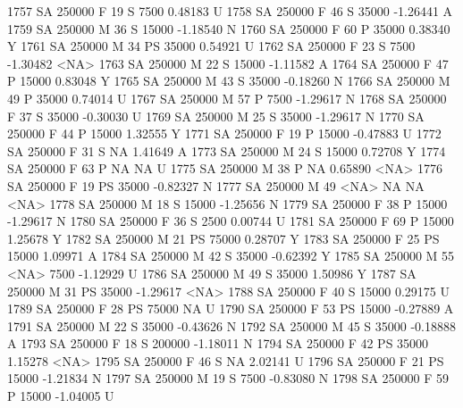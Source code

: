 \documentclass{article}
\begin{document}
\begin{Schunk}
\begin{Soutput}
1757     SA     250000   F  19         S   7500   0.48183    U
1758     SA     250000   F  46         S  35000  -1.26441    A
1759     SA     250000   M  36         S  15000  -1.18540    N
1760     SA     250000   F  60         P  35000   0.38340    Y
1761     SA     250000   M  34        PS  35000   0.54921    U
1762     SA     250000   F  23         S   7500  -1.30482 <NA>
1763     SA     250000   M  22         S  15000  -1.11582    A
1764     SA     250000   F  47         P  15000   0.83048    Y
1765     SA     250000   M  43         S  35000  -0.18260    N
1766     SA     250000   M  49         P  35000   0.74014    U
1767     SA     250000   M  57         P   7500  -1.29617    N
1768     SA     250000   F  37         S  35000  -0.30030    U
1769     SA     250000   M  25         S  35000  -1.29617    N
1770     SA     250000   F  44         P  15000   1.32555    Y
1771     SA     250000   F  19         P  15000  -0.47883    U
1772     SA     250000   F  31         S     NA   1.41649    A
1773     SA     250000   M  24         S  15000   0.72708    Y
1774     SA     250000   F  63         P     NA        NA    U
1775     SA     250000   M  38         P     NA   0.65890 <NA>
1776     SA     250000   F  19        PS  35000  -0.82327    N
1777     SA     250000   M  49      <NA>     NA        NA <NA>
1778     SA     250000   M  18         S  15000  -1.25656    N
1779     SA     250000   F  38         P  15000  -1.29617    N
1780     SA     250000   F  36         S   2500   0.00744    U
1781     SA     250000   F  69         P  15000   1.25678    Y
1782     SA     250000   M  21        PS  75000   0.28707    Y
1783     SA     250000   F  25        PS  15000   1.09971    A
1784     SA     250000   M  42         S  35000  -0.62392    Y
1785     SA     250000   M  55      <NA>   7500  -1.12929    U
1786     SA     250000   M  49         S  35000   1.50986    Y
1787     SA     250000   M  31        PS  35000  -1.29617 <NA>
1788     SA     250000   F  40         S  15000   0.29175    U
1789     SA     250000   F  28        PS  75000        NA    U
1790     SA     250000   F  53        PS  15000  -0.27889    A
1791     SA     250000   M  22         S  35000  -0.43626    N
1792     SA     250000   M  45         S  35000  -0.18888    A
1793     SA     250000   F  18         S 200000  -1.18011    N
1794     SA     250000   F  42        PS  35000   1.15278 <NA>
1795     SA     250000   F  46         S     NA   2.02141    U
1796     SA     250000   F  21        PS  15000  -1.21834    N
1797     SA     250000   M  19         S   7500  -0.83080    N
1798     SA     250000   F  59         P  15000  -1.04005    U

\end{Soutput}
\end{Schunk}
\end{document}

